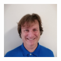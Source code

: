 \documentclass[10pt,a4paper]{article}
\begin{document}
\noindent\small
\colorbox{CouleurSection}{
    \begin{minipage}[t]{0.2\textwidth}
        \vspace{0pt} %
        \includegraphics[trim=20 0 20 20, clip, width=80pt]{latexImage_88a9fb5666ec9dfaab7b36fadf8aaf2a.png}
    \end{minipage}
    \begin{minipage}[t]{0.78\textwidth} 
        \vspace{15pt} %
        {\Huge \textbf{\textcolor{blanc}}}\\
        \vspace{10pt}
        {\LARGE \textcolor{blanc}}\\
        \vspace{3pt}
        {\large  \textcolor{blanc}}
    \end{minipage}
}
\noindent{}
\end{document}

